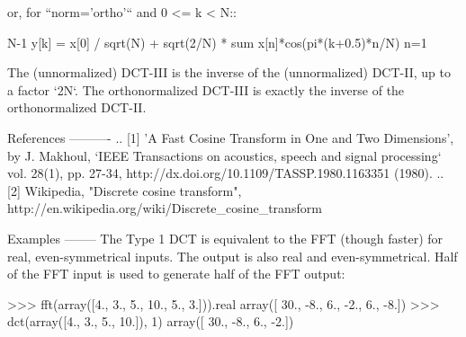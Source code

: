 \begin{DoxyVerb}
or, for ``norm='ortho'`` and 0 <= k < N::

                                      N-1
  y[k] = x[0] / sqrt(N) + sqrt(2/N) * sum x[n]*cos(pi*(k+0.5)*n/N)
                                      n=1

The (unnormalized) DCT-III is the inverse of the (unnormalized) DCT-II, up
to a factor `2N`. The orthonormalized DCT-III is exactly the inverse of
the orthonormalized DCT-II.

References
----------
.. [1] 'A Fast Cosine Transform in One and Two Dimensions', by J.
       Makhoul, `IEEE Transactions on acoustics, speech and signal
       processing` vol. 28(1), pp. 27-34,
       http://dx.doi.org/10.1109/TASSP.1980.1163351 (1980).
.. [2] Wikipedia, "Discrete cosine transform",
       http://en.wikipedia.org/wiki/Discrete_cosine_transform

Examples
--------
The Type 1 DCT is equivalent to the FFT (though faster) for real,
even-symmetrical inputs.  The output is also real and even-symmetrical.
Half of the FFT input is used to generate half of the FFT output:

>>> fft(array([4., 3., 5., 10., 5., 3.])).real
array([ 30.,  -8.,   6.,  -2.,   6.,  -8.])
>>> dct(array([4., 3., 5., 10.]), 1)
array([ 30.,  -8.,   6.,  -2.])\end{DoxyVerb}
 \hypertarget{namespacescipy_1_1fftpack_1_1realtransforms_a4b625068c8ca210c932d6d260e093b3e}{}

